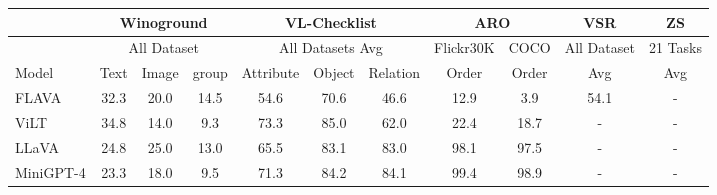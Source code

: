 \documentclass[11pt]{article}
\newcommand{\tablestyle}[2]{\setlength{\tabcolsep}{#1}\renewcommand{\arraystretch}{#2}\centering\footnotesize}
\begin{document}
\begin{table*}[t!]
    \centering
	\tablestyle{0.3pt}{1.0}
	\scriptsize
    \begin{small}
    \begin{tabular}{l|ccc|ccc|cc|c|c}
            \toprule
            &\multicolumn{3}{c|}{Winoground} & \multicolumn{3}{c|}{VL-Checklist} & \multicolumn{2}{c|}{ARO} & 
            \multicolumn{1}{c|}{VSR} &
            \multicolumn{1}{c}{ZS}
            \\
            \toprule
            &\multicolumn{3}{c|}{All Dataset}
            &\multicolumn{3}{c|}{All Datasets Avg}
            & Flickr30K
            & COCO
            & All Dataset
            & {21 Tasks}\\
            Model & Text & Image & group & Attribute & Object & Relation & Order & Order & Avg & Avg  \\


\midrule
            FLAVA  & 32.3 &20.0 & 14.5  & 54.6 & 70.6 & 46.6 & 12.9 & 3.9 & 54.1 & -\\
            ViLT  &34.8  &14.0 &9.3   &73.3  &85.0  &62.0  &22.4  &18.7  & - & -\\
            LLaVA  &24.8  &25.0 &13.0   &65.5  &83.1  &83.0  &98.1  &97.5  & - & -\\
            MiniGPT-4  & 23.3 &18.0 & 9.5  & 71.3 & 84.2 & 84.1 & 99.4 & 98.9 & - & -\\
            


\end{tabular}
\end{small}
\end{table*}
\end{document}
